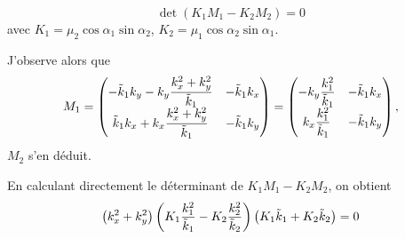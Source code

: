 \documentclass{amsart}
\begin{document}
\[
\operatorname{det}(K_1M_1-K_2M_2)=0
\]
avec \(K_1=\mu_2\cos \alpha_1\sin \alpha_2\), \(K_2=\mu_1\cos \alpha_2\sin \alpha_1\).

J'observe alors que
\[
M_1=
\begin{pmatrix}
-\tilde{k}_1k_y-k_y\dfrac{k_x^2+k_y^2}{\tilde{k}_1}  &   -\tilde{k}_1k_x
\\
\tilde{k}_1k_x+k_x\dfrac{k_x^2+k_y^2}{\tilde{k}_1}   &   -\tilde{k}_1k_y
\end{pmatrix}
=
\begin{pmatrix}
-k_y\dfrac{k_1^2}{\tilde{k}_1}   &   -\tilde{k}_1k_x
\\
k_x\dfrac{k_1^2}{\tilde{k}_1}    &   -\tilde{k}_1k_y
\end{pmatrix},
\]
\(M_2\) s'en déduit.

En calculant directement le déterminant de \(K_1M_1-K_2M_2\), on obtient
\[
\left(k_x^2+k_y^2\right)
\left(K_1\dfrac{k_1^2}{\tilde{k}_1} - K_2\dfrac{k_2^2}{\tilde{k}_2}\right)
\left(K_1\tilde{k}_1+K_2\tilde{k}_2\right) = 0
\]

\end{document}

